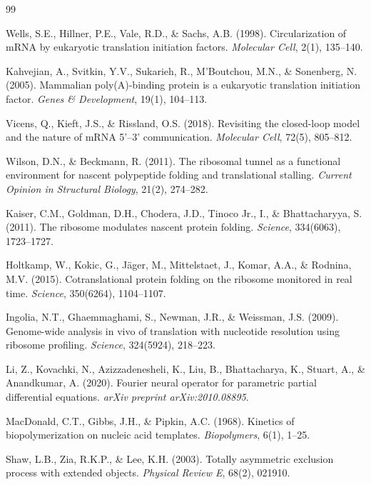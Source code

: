 \documentclass[11pt]{article}
\begin{document}
\begin{thebibliography}{99}

Wells, S.E., Hillner, P.E., Vale, R.D., \& Sachs, A.B. (1998).
Circularization of mRNA by eukaryotic translation initiation factors.
\textit{Molecular Cell}, 2(1), 135--140.

Kahvejian, A., Svitkin, Y.V., Sukarieh, R., M'Boutchou, M.N., \& Sonenberg, N. (2005).
Mammalian poly(A)-binding protein is a eukaryotic translation initiation factor.
\textit{Genes \& Development}, 19(1), 104--113.

Vicens, Q., Kieft, J.S., \& Rissland, O.S. (2018).
Revisiting the closed-loop model and the nature of mRNA 5'--3' communication.
\textit{Molecular Cell}, 72(5), 805--812.

Wilson, D.N., \& Beckmann, R. (2011).
The ribosomal tunnel as a functional environment for nascent polypeptide folding and translational stalling.
\textit{Current Opinion in Structural Biology}, 21(2), 274--282.

Kaiser, C.M., Goldman, D.H., Chodera, J.D., Tinoco Jr., I., \& Bhattacharyya, S. (2011).
The ribosome modulates nascent protein folding.
\textit{Science}, 334(6063), 1723--1727.

Holtkamp, W., Kokic, G., J\"{a}ger, M., Mittelstaet, J., Komar, A.A., \& Rodnina, M.V. (2015).
Cotranslational protein folding on the ribosome monitored in real time.
\textit{Science}, 350(6264), 1104--1107.

Ingolia, N.T., Ghaemmaghami, S., Newman, J.R., \& Weissman, J.S. (2009).
Genome-wide analysis in vivo of translation with nucleotide resolution using ribosome profiling.
\textit{Science}, 324(5924), 218--223.

Li, Z., Kovachki, N., Azizzadenesheli, K., Liu, B., Bhattacharya, K., Stuart, A., \& Anandkumar, A. (2020).
Fourier neural operator for parametric partial differential equations.
\textit{arXiv preprint arXiv:2010.08895}.

MacDonald, C.T., Gibbs, J.H., \& Pipkin, A.C. (1968).
Kinetics of biopolymerization on nucleic acid templates.
\textit{Biopolymers}, 6(1), 1--25.

Shaw, L.B., Zia, R.K.P., \& Lee, K.H. (2003).
Totally asymmetric exclusion process with extended objects.
\textit{Physical Review E}, 68(2), 021910.


\end{thebibliography}
\end{document}
